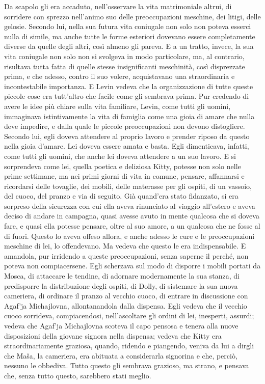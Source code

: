 Da scapolo gli era accaduto, nell'osservare la vita matrimoniale altrui, di sorridere con sprezzo nell'animo suo delle preoccupazioni meschine, dei litigi, delle gelosie. Secondo lui, nella sua futura vita coniugale non solo non poteva esserci nulla di simile, ma anche tutte le forme esteriori dovevano essere completamente diverse da quelle degli altri, così almeno gli pareva. E a un tratto, invece, la sua vita coniugale non solo non si svolgeva in modo particolare, ma, al contrario, risultava tutta fatta di quelle stesse insignificanti meschinità, così disprezzate prima, e che adesso, contro il suo volere, acquistavano una straordinaria e incontestabile importanza. E Levin vedeva che la organizzazione di tutte queste piccole cose era tutt'altro che facile come gli sembrava prima. Pur credendo di avere le idee più chiare sulla vita familiare, Levin, come tutti gli uomini, immaginava istintivamente la vita di famiglia come una gioia di amare che nulla deve impedire, e dalla quale le piccole preoccupazioni non devono distogliere. Secondo lui, egli doveva attendere al proprio lavoro e prender riposo da questo nella gioia d'amare. Lei doveva essere amata e basta. Egli dimenticava, infatti, come tutti gli uomini, che anche lei doveva attendere a un suo lavoro. E si sorprendeva come lei, quella poetica e deliziosa Kitty, potesse non solo nelle prime settimane, ma nei primi giorni di vita in comune, pensare, affannarsi e ricordarsi delle tovaglie, dei mobili, delle materasse per gli ospiti, di un vassoio, del cuoco, del pranzo e via di seguito. Già quand'era stato fidanzato, si era sorpreso della sicurezza con cui ella aveva rinunciato al viaggio all'estero e aveva deciso di andare in campagna, quasi avesse avuto in mente qualcosa che si doveva fare, e quasi ella potesse pensare, oltre al suo amore, a un qualcosa che ne fosse al di fuori. Questo lo aveva offeso allora, e anche adesso le cure e le preoccupazioni meschine di lei, lo offendevano. Ma vedeva che questo le era indispensabile. E amandola, pur irridendo a queste preoccupazioni, senza saperne il perché, non poteva non compiacersene. Egli scherzava sul modo di disporre i mobili portati da Mosca, di attaccare le tendine, di adornare modernamente la sua stanza, di predisporre la distribuzione degli ospiti, di Dolly, di sistemare la sua nuova cameriera, di ordinare il pranzo al vecchio cuoco, di entrare in discussione con Agaf'ja Michajlovna, allontanandola dalla dispensa. Egli vedeva che il vecchio cuoco sorrideva, compiacendosi, nell'ascoltare gli ordini di lei, inesperti, assurdi; vedeva che Agaf'ja Michajlovna scoteva il capo pensosa e tenera alla nuove disposizioni della giovane signora nella dispensa; vedeva che Kitty era straordinariamente graziosa, quando, ridendo e piangendo, veniva da lui a dirgli che Maša, la cameriera, era abituata a considerarla signorina e che, perciò, nessuno le obbediva. Tutto questo gli sembrava grazioso, ma strano, e pensava che, senza tutto questo, sarebbero stati meglio. 

